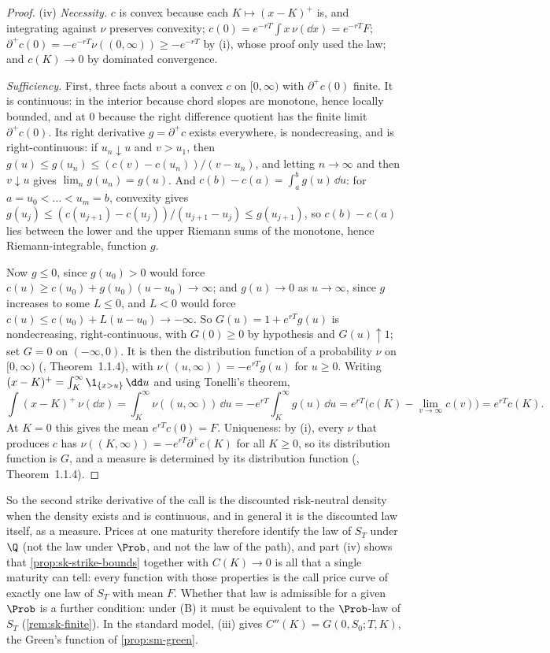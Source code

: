 \begin{proof}
(iv) \emph{Necessity.} $c$ is convex because each $K\mapsto(x-K)^+$ is, and integrating against $\nu$
preserves convexity; $c(0)=e^{-rT}\int x\,\nu(\dd x)=e^{-rT}F$; $\partial^+c(0)=-e^{-rT}\nu((0,\infty))\ge-e^{-rT}$ by (i),
whose proof only used the law; and $c(K)\to0$ by dominated convergence.

\emph{Sufficiency.} First, three facts about a convex $c$ on $[0,\infty)$ with $\partial^+c(0)$ finite.
It is continuous: in the interior because chord slopes are monotone, hence locally bounded, and at
$0$ because the right difference quotient has the finite limit $\partial^+c(0)$. Its right derivative
$g=\partial^+c$ exists everywhere, is nondecreasing, and is right-continuous: if $u_n\downarrow u$ and
$v>u_1$, then $g(u)\le g(u_n)\le(c(v)-c(u_n))/(v-u_n)$, and letting $n\to\infty$ and then $v\downarrow u$
gives $\lim_ng(u_n)=g(u)$. And $c(b)-c(a)=\int_a^bg(u)\,\dd u$: for $a=u_0<\dots<u_m=b$, convexity gives
$g(u_j)\le(c(u_{j+1})-c(u_j))/(u_{j+1}-u_j)\le g(u_{j+1})$, so $c(b)-c(a)$ lies between the lower and the
upper Riemann sums of the monotone, hence Riemann-integrable, function $g$.

Now $g\le0$, since $g(u_0)>0$ would force $c(u)\ge c(u_0)+g(u_0)(u-u_0)\to\infty$; and $g(u)\to0$ as
$u\to\infty$, since $g$ increases to some $L\le0$, and $L<0$ would force
$c(u)\le c(u_0)+L(u-u_0)\to-\infty$. So $G(u)=1+e^{rT}g(u)$ is nondecreasing, right-continuous, with
$G(0)\ge0$ by hypothesis and $G(u)\uparrow1$; set $G=0$ on $(-\infty,0)$. It is then the distribution
function of a probability $\nu$ on $[0,\infty)$ (\textcite{durrett}, Theorem~1.1.4), with
$\nu((u,\infty))=-e^{rT}g(u)$ for $u\ge0$. Writing $(x-K)^+=\int_K^\infty\1_{\{x>u\}}\,\dd u$ and
using Tonelli's theorem,
\[
  \int(x-K)^+\,\nu(\dd x)=\int_K^\infty\nu((u,\infty))\,\dd u=-e^{rT}\int_K^\infty g(u)\,\dd u
  =e^{rT}\Big(c(K)-\lim_{v\to\infty}c(v)\Big)=e^{rT}c(K).
\]
At $K=0$ this gives the mean $e^{rT}c(0)=F$. Uniqueness: by (i), every $\nu$ that produces $c$ has
$\nu((K,\infty))=-e^{rT}\partial^+c(K)$ for all $K\ge0$, so its distribution function is $G$, and a
measure is determined by its distribution function (\textcite{durrett}, Theorem~1.1.4).
\end{proof}

So the second strike derivative of the call is the discounted risk-neutral density when the
density exists and is continuous, and in general it is the discounted law itself, as a measure.
Prices at one maturity therefore identify the law of $S_T$ under $\Q$ (not the law under $\Prob$,
and not the law of the path), and part (iv) shows that \cref{prop:sk-strike-bounds} together
with $C(K)\to0$ is all that a single maturity can tell: every function with those properties is the
call price curve of exactly one law of $S_T$ with mean $F$. Whether that law is admissible for a given
$\Prob$ is a further condition: under (B) it must be equivalent to the $\Prob$-law of $S_T$
(\cref{rem:sk-finite}). In the standard model, (iii) gives
$C''(K)=G(0,S_0;T,K)$, the Green's function of \cref{prop:sm-green}.


